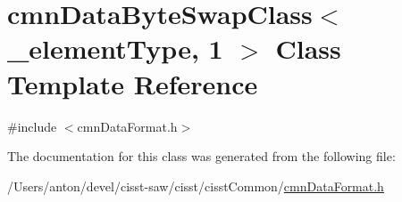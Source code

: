 \hypertarget{classcmn_data_byte_swap_class_3_01__element_type_00_011_01_4}{}\section{cmn\+Data\+Byte\+Swap\+Class$<$ \+\_\+element\+Type, 1 $>$ Class Template Reference}
\label{classcmn_data_byte_swap_class_3_01__element_type_00_011_01_4}


{\ttfamily \#include $<$cmn\+Data\+Format.\+h$>$}



The documentation for this class was generated from the following file\+:\begin{DoxyCompactItemize}
\item 
/\+Users/anton/devel/cisst-\/saw/cisst/cisst\+Common/\hyperlink{cmn_data_format_8h}{cmn\+Data\+Format.\+h}\end{DoxyCompactItemize}
